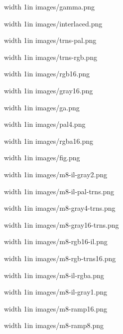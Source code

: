   
   
\def\inc#1{\pdfximage width 1in {images/#1}\pdfrefximage\pdflastximage\par}
\inc{gamma.png}\inc{interlaced.png}\inc{trns-pal.png}\inc{trns-rgb.png}\inc{rgb16.png}\inc{gray16.png}
\inc{ga.png}\inc{pal4.png}\inc{rgba16.png}\inc{fig.png}
\inc{m8-il-gray2.png}\inc{m8-il-pal-trns.png}\inc{m8-gray4-trns.png}\inc{m8-gray16-trns.png}\inc{m8-rgb16-il.png}
\inc{m8-rgb-trns16.png}\inc{m8-il-rgba.png}\inc{m8-il-gray1.png}\inc{m8-ramp16.png}\inc{m8-ramp8.png}
\bye
